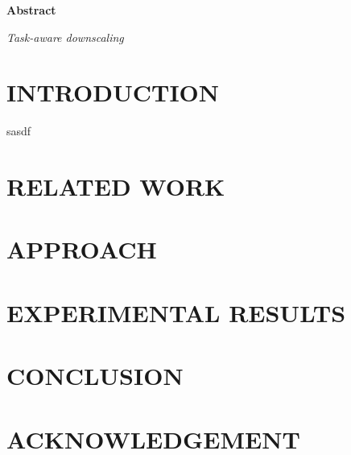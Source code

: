 \documentclass[12pt]{article}
\begin{document}
\begin{multicols}{2}

\begin{center}\textbf{Abstract}\end{center}
\textit{
Task-aware downscaling
}

\section{INTRODUCTION}

sasdf
\section{RELATED WORK}


\section{APPROACH}


\section{EXPERIMENTAL RESULTS}

\section{CONCLUSION}

\section{ACKNOWLEDGEMENT}
\end{multicols}
\end{document}
